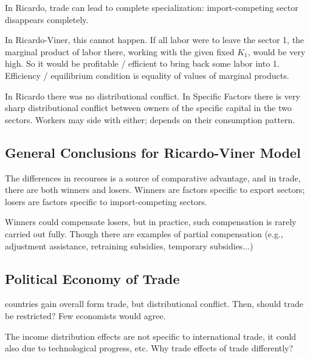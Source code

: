 In Ricardo, trade can lead to complete specialization:
import-competing sector disappears completely.

In Ricardo-Viner, this cannot happen. If all labor were to leave the sector 1,
the marginal product of labor there, working with the given fixed
$K_1$, would be very high. So it would be profitable / efficient to bring
back some labor into 1. Efficiency / equilibrium condition is
equality of values of marginal products.

In Ricardo there was no distributional conflict. In Specific Factors
there is very sharp distributional conflict between owners of the
specific capital in the two sectors. Workers may side with either;
depends on their consumption pattern.

\subsection{General Conclusions for Ricardo-Viner Model}

The differences in recourses is a source of comparative advantage, and in trade, there are both winners and losers.
Winners are factors specific to export sectors;
losers are factors specific to import-competing sectors.

Winners could compensate losers, but in practice,
such compensation is rarely carried out fully.
Though there are examples of partial compensation (e.g.,
adjustment assistance, retraining subsidies, temporary
subsidies...)

\subsection{Political Economy of Trade}

countries gain overall form trade, but distributional conflict. Then, should trade be restricted?
Few economists would agree.

The income distribution effects are not specific to international trade, it could also due to technological progress, etc.
Why trade effects of trade differently?
